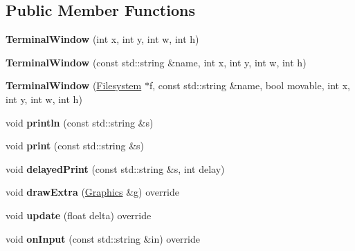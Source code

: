 \subsection*{Public Member Functions}
\begin{DoxyCompactItemize}
\item 
\hypertarget{class_terminal_window_a7b89a7a0cfb640d6ae525d953dedce1d}{}\label{class_terminal_window_a7b89a7a0cfb640d6ae525d953dedce1d} 
{\bfseries Terminal\+Window} (int x, int y, int w, int h)
\item 
\hypertarget{class_terminal_window_ab75d0fc5b3ed21c027c5104eb569d347}{}\label{class_terminal_window_ab75d0fc5b3ed21c027c5104eb569d347} 
{\bfseries Terminal\+Window} (const std\+::string \&name, int x, int y, int w, int h)
\item 
\hypertarget{class_terminal_window_a30a31d7c6db112eb5d6e83d0b15f16c5}{}\label{class_terminal_window_a30a31d7c6db112eb5d6e83d0b15f16c5} 
{\bfseries Terminal\+Window} (\hyperlink{class_filesystem}{Filesystem} $\ast$f, const std\+::string \&name, bool movable, int x, int y, int w, int h)
\item 
\hypertarget{class_terminal_window_a263373e2b1075577b559e4b15cae5129}{}\label{class_terminal_window_a263373e2b1075577b559e4b15cae5129} 
void {\bfseries println} (const std\+::string \&s)
\item 
\hypertarget{class_terminal_window_aa73dac9edcb57067e7f662ba9886d16e}{}\label{class_terminal_window_aa73dac9edcb57067e7f662ba9886d16e} 
void {\bfseries print} (const std\+::string \&s)
\item 
\hypertarget{class_terminal_window_a11075e3cd2358dec17179b738d24e744}{}\label{class_terminal_window_a11075e3cd2358dec17179b738d24e744} 
void {\bfseries delayed\+Print} (const std\+::string \&s, int delay)
\item 
\hypertarget{class_terminal_window_ad8c7ad0aa81a42bfc0c65b32d99b37cb}{}\label{class_terminal_window_ad8c7ad0aa81a42bfc0c65b32d99b37cb} 
void {\bfseries draw\+Extra} (\hyperlink{class_graphics}{Graphics} \&g) override
\item 
\hypertarget{class_terminal_window_af82db18ec900835a3489281265bd3601}{}\label{class_terminal_window_af82db18ec900835a3489281265bd3601} 
void {\bfseries update} (float delta) override
\item 
\hypertarget{class_terminal_window_a96697b91e22369a25ccd373c6d576bce}{}\label{class_terminal_window_a96697b91e22369a25ccd373c6d576bce} 
void {\bfseries on\+Input} (const std\+::string \&in) override
\item 

\end{DoxyCompactItemize}
